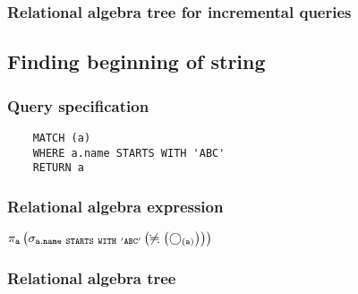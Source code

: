 	\subsubsection*{Relational algebra tree for incremental queries}

	\subsection{Finding beginning of string}

	\subsubsection*{Query specification}

	\begin{lstlisting}
	MATCH (a)
	WHERE a.name STARTS WITH 'ABC'
	RETURN a
	\end{lstlisting}


	\subsubsection*{Relational algebra expression}

	$\projection{\var{a}} \left(\selection{\mathtt{a.name~STARTS~WITH~'ABC'}} \left(\alldifferent{} \left(\getvertices{a}{}\right)\right)\right)$

	\subsubsection*{Relational algebra tree}


